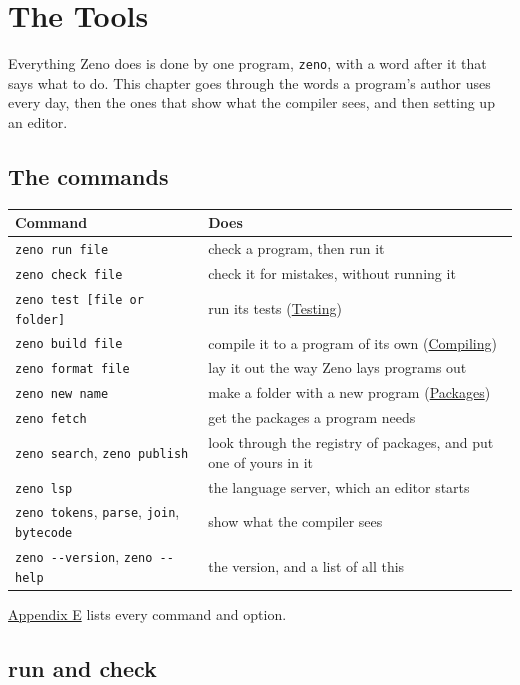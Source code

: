 \chapter{The Tools}\label{ch-tools}

Everything Zeno does is done by one program, \verb|zeno|, with a word
after it that says what to do. This chapter goes through the words a
program's author uses every day, then the ones that show what the
compiler sees, and then setting up an editor.

\section{The commands}

\begin{center}
\begin{tabular}{lP{8.6cm}}
\toprule
Command & Does \\
\midrule
\verb|zeno run file| & check a program, then run it \\
\verb|zeno check file| & check it for mistakes, without running it \\
\verb|zeno test [file or folder]| & run its tests (\hyperref[ch-testing]{Testing}) \\
\verb|zeno build file| & compile it to a program of its own (\hyperref[ch-compiling]{Compiling}) \\
\verb|zeno format file| & lay it out the way Zeno lays programs out \\
\verb|zeno new name| & make a folder with a new program (\hyperref[ch-packages]{Packages}) \\
\verb|zeno fetch| & get the packages a program needs \\
\verb|zeno search|, \verb|zeno publish| & look through the registry of
  packages, and put one of yours in it \\
\verb|zeno lsp| & the language server, which an editor starts \\
\verb|zeno tokens|, \verb|parse|, \verb|join|, \verb|bytecode| & show what the compiler sees \\
\verb|zeno --version|, \verb|zeno --help| & the version, and a list of all this \\
\bottomrule
\end{tabular}
\end{center}

\hyperref[app-commands]{Appendix E} lists every command
and option.

\section{run and check}

